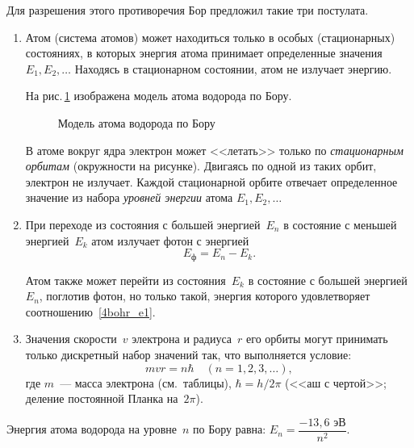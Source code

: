 \documentclass[main.tex]{subfiles}
\begin{document}
Для разрешения этого противоречия Бор предложил такие три постулата.
\begin{enumerate}
    \item [\textbf{I.}] Атом (система атомов) может находиться только в особых (стационарных) состояниях, в которых энергия атома принимает определенные значения $E_1, E_2,\ldots$ Находясь в стационарном состоянии, атом не излучает энергию.

    На рис.\,\ref{fig:p201} изображена модель атома водорода по Бору.
    
    \begin{figure}[H]
    \centering

\caption{Модель атома водорода по Бору}
\label{fig:p201}
\end{figure}
\nointerlineskip

    В атоме вокруг ядра электрон может <<летать>> только по \emph{стационарным орбитам} (окружности на рисунке). Двигаясь по одной из таких орбит, электрон не излучает. Каждой стационарной орбите отвечает определенное значение из набора \emph{уровней энергии} атома $E_1,E_2,\ldots$ 
    
    \item [\textbf{II.}] При переходе из состояния с большей энергией~$E_n$ в состояние с меньшей энергией~$E_k$ атом излучает фотон с энергией
    \begin{equation}
        \label{4bohr_e1}
        E_\text{ф}=E_n-E_k.
    \end{equation}

    Атом также может перейти из состояния~$E_k$ в состояние с большей энергией~$E_n$, поглотив фотон, но только такой, энергия которого удовлетворяет соотношению~\eqref{4bohr_e1}.

    \item [\textbf{III.}] Значения скорости~$v$ электрона и радиуса~$r$ его орбиты могут принимать только дискретный набор значений так, что выполняется условие:
    \begin{equation}
        mvr=n\hbar\quad (n=1,2,3,\ldots),
    \end{equation}
    где $m$~--- масса электрона (см.~таблицы), $\hbar=h/2\pi$ (<<аш с чертой>>; деление постоянной Планка на~$2\pi$). 
    
\end{enumerate}

Энергия атома водорода на уровне~$n$ по Бору равна: $E_n=\dfrac{-13{,}6\text{~эВ}}{n^2}$.














 
\end{document}
